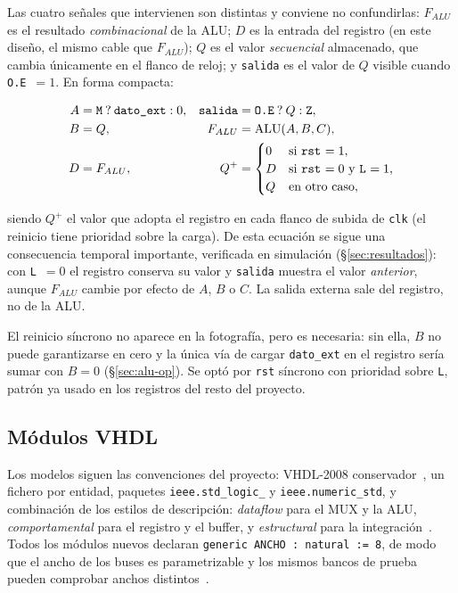 \documentclass[llncs]{llncs}
\begin{document}
Las cuatro señales que intervienen son distintas y conviene no
confundirlas: $F_{ALU}$ es el resultado \emph{combinacional} de la ALU;
$D$ es la entrada del registro (en este diseño, el mismo cable que
$F_{ALU}$); $Q$ es el valor \emph{secuencial} almacenado, que cambia
únicamente en el flanco de reloj; y \texttt{salida} es el valor de $Q$
visible cuando \texttt{O.E}~$=1$. En forma compacta:

\begin{align*}
  A          &= \texttt{M} \mathbin{?} \texttt{dato\_ext} : 0,
    & \texttt{salida} &= \texttt{O.E} \mathbin{?} Q : \texttt{Z}, \\
  B          &= Q, &
  F_{ALU}    &= \mathrm{ALU}(A, B, C), \\
  D          &= F_{ALU}, &
  Q^{+}      &= \begin{cases}
      0   & \text{si \texttt{rst} $=1$},\\
      D   & \text{si \texttt{rst} $=0$ y \texttt{L} $=1$},\\
      Q   & \text{en otro caso},
    \end{cases}
\end{align*}

\noindent siendo $Q^{+}$ el valor que adopta el registro en cada flanco de
subida de \texttt{clk} (el reinicio tiene prioridad sobre la carga). De
esta ecuación se sigue una consecuencia temporal importante, verificada en
simulación (§\ref{sec:resultados}): con \texttt{L}~$=0$ el registro
conserva su valor y \texttt{salida} muestra el valor \emph{anterior},
aunque $F_{ALU}$ cambie por efecto de $A$, $B$ o $C$. La salida externa
sale del registro, no de la ALU.

El reinicio síncrono no aparece en la fotografía, pero es necesaria: sin
ella, $B$ no puede garantizarse en cero y la única vía de cargar
\texttt{dato\_ext} en el registro sería sumar con $B=0$ (§\ref{sec:alu-op}).
Se optó por \texttt{rst} síncrono con prioridad sobre \texttt{L}, patrón ya
usado en los registros del resto del proyecto.

\subsection{Módulos VHDL}
\label{sec:modulos}

Los modelos siguen las convenciones del proyecto: VHDL-2008
conservador~\cite{ieee1076_2008}, un fichero por entidad, paquetes
\texttt{ieee.std\_\-logic\_} y \texttt{ieee.numeric\_\-std}, y
combinación
de los estilos de descripción: \emph{dataflow} para el MUX y la ALU,
\emph{comportamental} para el registro y el buffer, y \emph{estructural}
para la integración~\cite{navabi1998vhdl}. Todos los módulos nuevos
declaran \texttt{generic ANCHO : natural := 8}, de modo que el ancho de los
buses es parametrizable y los mismos bancos de prueba pueden comprobar
anchos distintos~\cite{harris2015ddca}.
\end{document}
